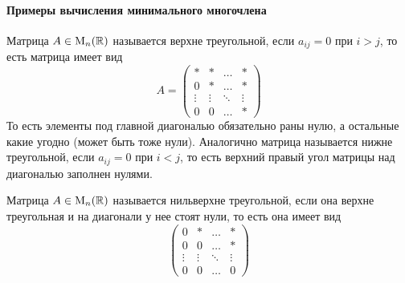 \paragraph{Примеры вычисления минимального многочлена}

Матрица $A\in\operatorname{M}_{n}(\mathbb R)$ называется верхне треугольной, если $a_{ij} = 0$ при $i > j$, то есть матрица имеет вид
\[
A=
\begin{pmatrix}
{*}&{*}&{\ldots}&{*}\\
{0}&{*}&{\ldots}&{*}\\
{\vdots}&{\vdots}&{\ddots}&{\vdots}\\
{0}&{0}&{\ldots}&{*}
\end{pmatrix}
\]
То есть элементы под главной диагональю обязательно раны нулю, а остальные какие угодно (может быть тоже нули). Аналогично матрица называется нижне треугольной, если $a_{ij} = 0$ при $i < j$, то есть верхний правый угол матрицы над диагональю заполнен нулями.

Матрица $A\in \operatorname{M}_{n}(\mathbb R)$ называется нильверхне треугольной, если она верхне треугольная и на диагонали у нее стоят нули, то есть она имеет вид
\[
\begin{pmatrix}
{0}&{*}&{\ldots}&{*}\\
{0}&{0}&{\ldots}&{*}\\
{\vdots}&{\vdots}&{\ddots}&{\vdots}\\
{0}&{0}&{\ldots}&{0}
\end{pmatrix}
\]

